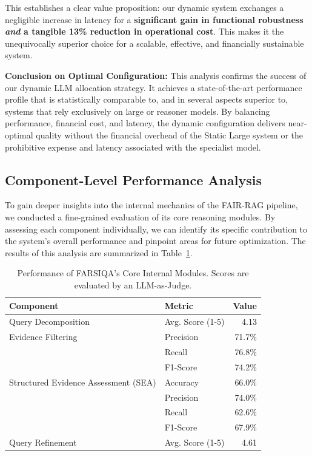 \documentclass[11pt]{article}
\begin{document}
This establishes a clear value proposition: our dynamic system exchanges a negligible increase in latency for a \textbf{significant gain in functional robustness \emph{and} a tangible 13\% reduction in operational cost}. This makes it the unequivocally superior choice for a scalable, effective, and financially sustainable system.

  \textbf{Conclusion on Optimal Configuration:} This analysis confirms the success of our dynamic LLM allocation strategy. It achieves a state-of-the-art performance profile that is statistically comparable to, and in several aspects superior to, systems that rely exclusively on large or reasoner models. By balancing performance, financial cost, and latency, the dynamic configuration delivers near-optimal quality without the financial overhead of the Static Large system or the prohibitive expense and latency associated with the specialist model.

\subsection{Component-Level Performance Analysis}

To gain deeper insights into the internal mechanics of the FAIR-RAG pipeline, we conducted a fine-grained evaluation of its core reasoning modules. By assessing each component individually, we can identify its specific contribution to the system's overall performance and pinpoint areas for future optimization. The results of this analysis are summarized in Table~\ref{tab:component-performance}.

\begin{table}[t]
\centering
\small
\begin{tabular}{llr}
\hline
\textbf{Component} & \textbf{Metric} & \textbf{Value} \\
\hline
Query Decomposition & Avg. Score (1-5) & 4.13 \\
\hline
Evidence Filtering & Precision & 71.7\% \\
& Recall & 76.8\% \\
& F1-Score & 74.2\% \\
\hline
Structured Evidence Assessment (SEA) & Accuracy & 66.0\% \\
& Precision & 74.0\% \\
& Recall & 62.6\% \\
& F1-Score & 67.9\% \\
\hline
Query Refinement & Avg. Score (1-5) & 4.61 \\
\hline
\end{tabular}
\caption{Performance of FARSIQA's Core Internal Modules. Scores are evaluated by an LLM-as-Judge.}
\label{tab:component-performance}
\end{table}
\end{document}
